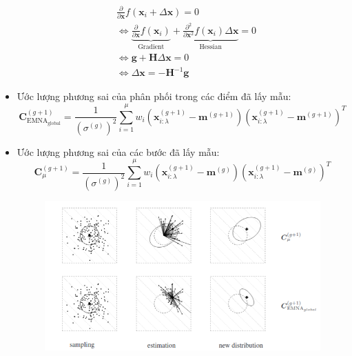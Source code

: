 \documentclass{book}
\begin{document}
\begin{itemize}
\begin{equation*}
            \begin{aligned}
                &\frac{\partial}{\partial \mathbf{x}}f(\mathbf{x}_i+\Delta\mathbf{x}) = 0 \\
                &\Leftrightarrow\underbrace{\frac{\partial}{\partial \mathbf{x}}f(\mathbf{x}_i)}_{\operatorname{Gradient}}+\underbrace{\frac{\partial^2}{\partial \mathbf{x}^2}f(\mathbf{x}_i)\Delta\mathbf{x}}_{\operatorname{Hessian}}=0 \\ %
                &\Leftrightarrow \mathbf{g}+\mathbf{H}\Delta\mathbf{x}=0 \\
                &\Leftrightarrow\Delta\mathbf{x}=-\mathbf{H}^{-1}\mathbf{g}
            \end{aligned}
        \end{equation*}
        \item Ước lượng phương sai của phân phối trong các điểm đã lấy mẫu:
        \begin{equation*}
            \mathbf{C}^{(g+1)}_{\text{EMNA}_{\text{global}}}=\frac{1}{(\sigma^{(g)})^2}\sum_{i=1}^{\mu}w_i(\mathbf{x}_{i:\lambda}^{(g+1)}-\mathbf{m}^{(g+1)})(\mathbf{x}_{i:\lambda}^{(g+1)}-\mathbf{m}^{(g+1)})^T
        \end{equation*}
        \item Ước lượng phương sai của các bước đã lấy mẫu:
        \begin{equation*}
            \mathbf{C}^{(g+1)}_{\mu}=\frac{1}{(\sigma^{(g)})^2}\sum_{i=1}^{\mu}w_i(\mathbf{x}_{i:\lambda}^{(g+1)}-\mathbf{m}^{(g)})(\mathbf{x}_{i:\lambda}^{(g+1)}-\mathbf{m}^{(g)})^T
        \end{equation*}
        \begin{figure}[H] %
            \centering
            \includegraphics[width=\textwidth]{images/estimating_the_covariance_matrix.png}

\end{figure}
\end{itemize}
\end{document}
